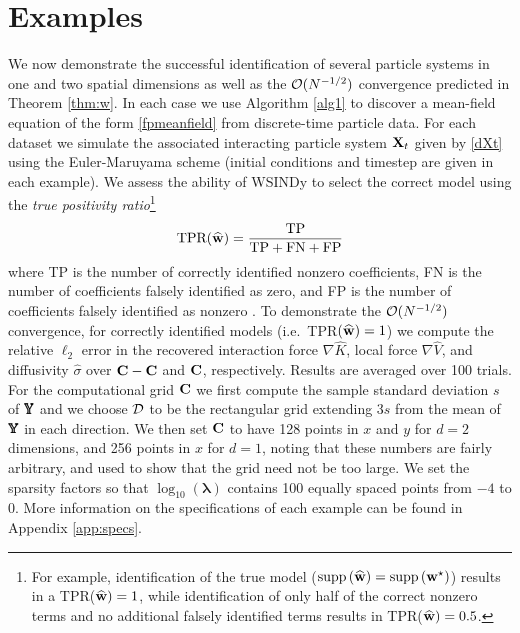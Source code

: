 \documentclass[english,reqno]{amsart}
\begin{document}
\section{Examples}\label{sec:examples}

We now demonstrate the successful identification of several particle systems in one and two spatial dimensions as well as the ${\mathcal{O}}(N^{-1/2})$ convergence predicted in Theorem \ref{thm:w}. In each case we use Algorithm \ref{alg1} to discover a mean-field equation of the form \eqref{fpmeanfield} from discrete-time particle data. For each dataset we simulate the associated interacting particle system $\mathbf{X}_t$ given by \eqref{dXt} using the Euler-Maruyama scheme (initial conditions and timestep are given in each example). We assess the ability of WSINDy to select the correct model using the \textit{true positivity ratio}\footnote{For example, identification of the true model ($\text{supp}\left({\widehat{\mathbf{w}}}\right) =\text{supp}\left(\mathbf{w}^\star\right)$) results in a TPR(${\widehat{\mathbf{w}}})=1$, while identification of only half of the correct nonzero terms and no additional falsely identified terms results in TPR(${\widehat{\mathbf{w}}})=0.5$.} 
\begin{equation}\label{tpr}
\text{TPR}({\widehat{\mathbf{w}}}) = \frac{\text{TP}}{\text{TP}+\text{FN}+\text{FP}}
\end{equation}
where TP is the number of correctly identified nonzero coefficients, FN is the number of coefficients falsely identified as zero, and FP is the number of coefficients falsely identified as nonzero \cite{LagergrenNardiniMichaelLavigneEtAl2020ProcRSocA}. To demonstrate the ${\mathcal{O}}(N^{-1/2})$ convergence, for correctly identified models (i.e.\ TPR$({\widehat{\mathbf{w}}})=1$) we compute the relative $\ell_2$ error in the recovered interaction force $\nabla \widehat{K}$, local force $\nabla \widehat{V}$, and diffusivity $\widehat{\sigma}$ over $\mathbf{C}-\mathbf{C}$ and $\mathbf{C}$, respectively. Results are averaged over 100 trials.\\

For the computational grid $\mathbf{C}$ we first compute the sample standard deviation $s$ of $\pmb{\mathbb{Y}}$ and we choose ${\mathcal{D}}$ to be the rectangular grid extending $3s$ from the mean of $\pmb{\mathbb{Y}}$ in each direction. We then set $\mathbf{C}$ to have 128 points in $x$ and $y$ for $d=2$ dimensions, and 256 points in $x$ for $d=1$, noting that these numbers are fairly arbitrary, and used to show that the grid need not be too large. We set the sparsity factors so that $\log_{10}(\pmb{\lambda})$ contains 100 equally spaced points from $-4$ to 0. More information on the specifications of each example can be found in Appendix \ref{app:specs}. 
\end{document}
